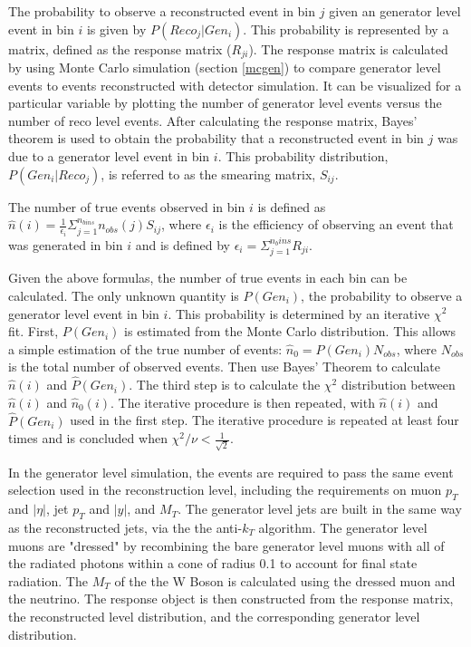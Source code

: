 \documentclass[oneside, letterpaper, oldfontcommands]{memoir}
\begin{document}
\qquad The probability to observe a reconstructed event in bin $j$ given an generator level event in bin $i$ is given by $P(Reco_{j}|Gen_{i})$. This probability is represented by a matrix, defined as the response matrix ($R_{ji}$). The response matrix is calculated by using Monte Carlo simulation (section \ref{mcgen}) to compare generator level events to events reconstructed with detector simulation. It can be visualized for a particular variable by plotting the number of generator level events versus the number of reco level events. After calculating the response matrix, Bayes' theorem is used to obtain the probability that a reconstructed event in bin $j$ was due to a generator level event in bin $i$. This probability distribution, $P(Gen_{i}|Reco_{j})$, is referred to as the smearing matrix, $S_{ij}$.

\qquad The number of true events observed in bin $i$ is defined as $\hat{n}(i) = \frac{1}{\epsilon_{i}}\Sigma_{j=1}^{n_{bins}}n_{obs}(j)S_{ij}$, where $\epsilon_{i}$ is the efficiency of observing an event that was generated in bin $i$ and is defined by $\epsilon_{i}=\Sigma_{j=1}^{n_bins}R_{ji}$.

\qquad Given the above formulas, the number of true events in each bin can be calculated. The only unknown quantity is $P(Gen_{i})$, the probability to observe a generator level event in bin $i$. This probability is determined by an iterative $\chi^2$ fit. First, $P(Gen_{i})$ is estimated from the Monte Carlo distribution. This allows a simple estimation of the true number of events: $\hat{n}_{0} = P(Gen_{i})N_{obs}$, where $N_{obs}$ is the total number of observed events. Then use Bayes' Theorem to calculate $\hat{n}(i)$ and $\hat{P}(Gen_{i})$. The third step is to calculate the $\chi^{2}$ distribution between $\hat{n}(i)$ and $\hat{n}_{0}(i)$. The iterative procedure is then repeated, with $\hat{n}(i)$ and $\hat{P}(Gen_{i})$ used in the first step. The iterative procedure is repeated at least four times and is concluded when $\chi^{2}/\nu < \frac{1}{\sqrt{2}}$.

\qquad In the generator level simulation, the events are required to pass the same event selection used in the reconstruction level, including the requirements on muon $p_{T}$ and $|\eta|$, jet $p_{T}$ and $|y|$, and $M_{T}$. The generator level jets are built in the same way as the reconstructed jets, via the the anti-$k_{T}$ algorithm. The generator level muons are "dressed" by recombining the bare generator level muons with all of the radiated photons within a cone of radius 0.1 to account for final state radiation. The $M_{T}$ of the the W Boson is calculated using the dressed muon and the neutrino. The response object is then constructed from the response matrix, the reconstructed level distribution, and the corresponding generator level distribution. 
\end{document}
